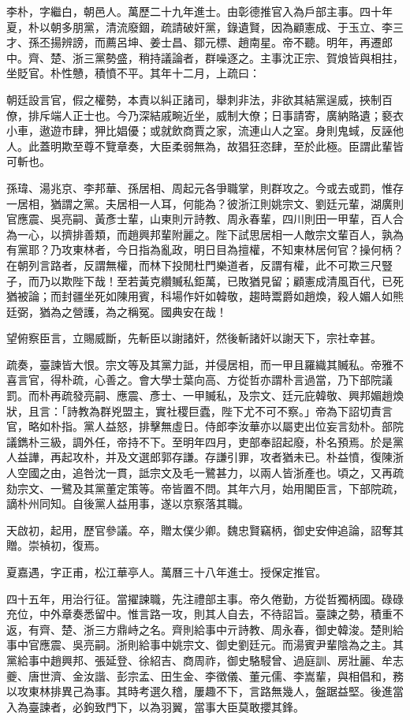 \begin{pinyinscope}
李朴，字繼白，朝邑人。萬歷二十九年進士。由彰德推官入為戶部主事。四十年夏，朴以朝多朋黨，清流廢錮，疏請破奸黨，錄遺賢，因為顧憲成、于玉立、李三才、孫丕揚辨謗，而薦呂坤、姜士昌、鄒元標、趙南星。帝不聽。明年，再遷郎中。齊、楚、浙三黨勢盛，稍持議論者，群噪逐之。主事沈正宗、賀烺皆與相拄，坐貶官。朴性戇，積憤不平。其年十二月，上疏曰：

朝廷設言官，假之權勢，本責以糾正諸司，舉刺非法，非欲其結黨逞威，挾制百僚，排斥端人正士也。今乃深結戚畹近坐，威制大僚；日事請寄，廣納賂遺；褻衣小車，遨遊市肆，狎比娼優；或就飲商賈之家，流連山人之室。身則鬼蜮，反誣他人。此蓋明欺至尊不覽章奏，大臣柔弱無為，故猖狂恣肆，至於此極。臣謂此輩皆可斬也。

孫瑋、湯兆京、李邦華、孫居相、周起元各爭職掌，則群攻之。今或去或罰，惟存一居相，猶謂之黨。夫居相一人耳，何能為？彼浙江則姚宗文、劉廷元輩，湖廣則官應震、吳亮嗣、黃彥士輩，山東則亓詩教、周永春輩，四川則田一甲輩，百人合為一心，以擠排善類，而趙興邦輩附麗之。陛下試思居相一人敵宗文輩百人，孰為有黨耶？乃攻東林者，今日指為亂政，明日目為擅權，不知東林居何官？操何柄？在朝列言路者，反謂無權，而林下投閒杜門樂道者，反謂有權，此不可欺三尺豎子，而乃以欺陛下哉！至若黃克纘贓私鉅萬，已敗猶見留；顧憲成清風百代，已死猶被論；而封疆坐死如陳用賓，科場作奸如韓敬，趨時鬻爵如趙煥，殺人媚人如熊廷弼，猶為之營護，為之稱冤。國典安在哉！

望俯察臣言，立賜威斷，先斬臣以謝諸奸，然後斬諸奸以謝天下，宗社幸甚。

疏奏，臺諫皆大恨。宗文等及其黨力詆，并侵居相，而一甲且羅織其贓私。帝雅不喜言官，得朴疏，心善之。會大學士葉向高、方從哲亦謂朴言過當，乃下部院議罰。而朴再疏發亮嗣、應震、彥士、一甲贓私，及宗文、廷元庇韓敬、興邦媚趙煥狀，且言：「詩教為群兇盟主，實社稷巨蠹，陛下尤不可不察。」帝為下詔切責言官，略如朴指。黨人益怒，排擊無虛日。侍郎李汝華亦以屬吏出位妄言劾朴。部院議鐫朴三級，調外任，帝持不下。至明年四月，吏部奉詔起廢，朴名預焉。於是黨人益譁，再起攻朴，并及文選郎郭存謙。存謙引罪，攻者猶未已。朴益憤，復陳浙人空國之由，追咎沈一貫，詆宗文及毛一鷺甚力，以兩人皆浙產也。頃之，又再疏劾宗文、一鷺及其黨董定策等。帝皆置不問。其年六月，始用閣臣言，下部院疏，謫朴州同知。自後黨人益用事，遂以京察落其職。

天啟初，起用，歷官參議。卒，贈太僕少卿。魏忠賢竊柄，御史安伸追論，詔奪其贈。崇禎初，復焉。

夏嘉遇，字正甫，松江華亭人。萬曆三十八年進士。授保定推官。

四十五年，用治行征。當擢諫職，先注禮部主事。帝久倦勤，方從哲獨柄國。碌碌充位，中外章奏悉留中。惟言路一攻，則其人自去，不待詔旨。臺諫之勢，積重不返，有齊、楚、浙三方鼎峙之名。齊則給事中亓詩教、周永春，御史韓浚。楚則給事中官應震、吳亮嗣。浙則給事中姚宗文、御史劉廷元。而湯賓尹輩陰為之主。其黨給事中趙興邦、張延登、徐紹吉、商周祚，御史駱駸曾、過庭訓、房壯麗、牟志夔、唐世濟、金汝諧、彭宗孟、田生金、李徵儀、董元儒、李嵩輩，與相倡和，務以攻東林排異己為事。其時考選久稽，屢趣不下，言路無幾人，盤踞益堅。後進當入為臺諫者，必鉤致門下，以為羽翼，當事大臣莫敢攖其鋒。


\end{pinyinscope}
